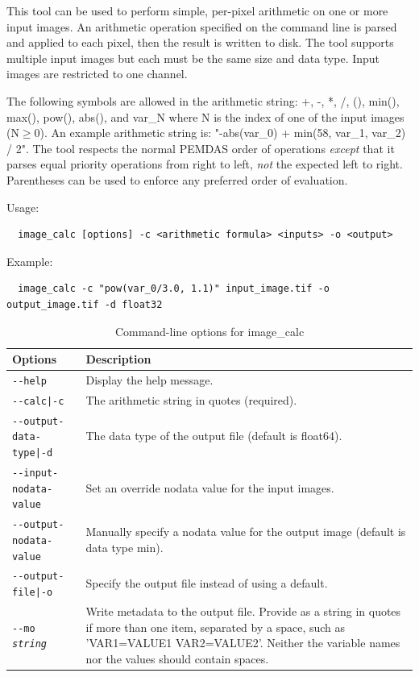 This tool can be used to perform simple, per-pixel arithmetic on one or more
input images. An arithmetic operation specified on the command line is parsed
and applied to each pixel, then the result is written to disk. The tool
supports multiple input images but each must be the same size and data type.
Input images are restricted to one channel.

The following symbols are allowed in the arithmetic string: +, -, *, /,
(), min(), max(), pow(), abs(), and var\_N where N is the index of one
of the input images (N$\ge$0). An example arithmetic string is: "-abs(var\_0) +
min(58, var\_1, var\_2) / 2".  The tool respects the normal PEMDAS order
of operations \textit{except} that it parses equal priority operations
from right to left, \textit{not} the expected left to right.
Parentheses can be used to enforce any preferred order of evaluation.

\medskip

Usage:
\begin{verbatim}
  image_calc [options] -c <arithmetic formula> <inputs> -o <output>
\end{verbatim}

Example:
\begin{verbatim}
  image_calc -c "pow(var_0/3.0, 1.1)" input_image.tif -o output_image.tif -d float32
\end{verbatim}

\medskip

\begin{longtable}{|l|p{10cm}|}
\caption{Command-line options for image\_calc}
\label{tbl:imagecalc}
\endfirsthead
\endhead
\endfoot
\endlastfoot
\hline
Options & Description \\ \hline \hline
\texttt{-\/-help} & Display the help message.\\ \hline
\texttt{-\/-calc|-c} & The arithmetic string in quotes (required).\\ \hline
\texttt{-\/-output-data-type|-d} & The data type of the output file (default is float64).\\ \hline
\texttt{-\/-input-nodata-value} & Set an override nodata value for the input images.\\ \hline
\texttt{-\/-output-nodata-value} & Manually specify a nodata value for the output image (default is data type min).\\ \hline
\texttt{-\/-output-file|-o} & Specify the output file instead of using a default.\\ \hline
\texttt{-\/-mo \textit{string}} & Write metadata to the output file. Provide as a string in quotes if more than one item, separated by a space, such as 'VAR1=VALUE1 VAR2=VALUE2'. Neither the variable names nor the values should contain spaces. \\ \hline
\end{longtable}

